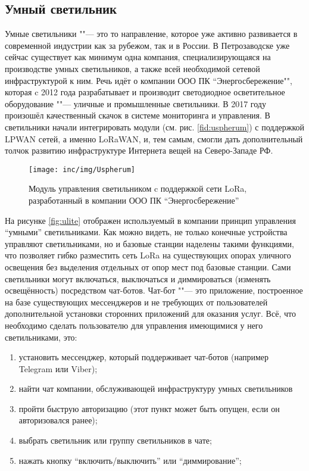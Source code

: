 \subsection{Умный светильник}

Умные светильники ""--- это то направление, которое уже активно развивается в современной индустрии как за рубежом, так и в России.
В Петрозаводске уже сейчас существует как минимум одна компания, специализирующаяся на производстве умных светильников, а также всей необходимой сетевой инфраструктурой к ним. 
Речь идёт о компании ООО ПК ``Энергосбережение"", которая c 2012 года разрабатывает и производит светодиодное осветительное оборудование ""--- уличные и промышленные светильники.
В 2017 году произошёл качественный скачок в системе мониторинга и управления.
В светильники начали интегрировать модули (см. рис. \ref{fid:uspherum}) с поддержкой LPWAN сетей, а именно LoRaWAN, и, тем самым, смогли дать дополнительный толчок развитию инфраструктуре Интернета вещей на Северо-Западе РФ.

\begin{figure}[!h]
  \centering
  \texttt{[image: inc/img/Uspherum]}
  \caption{Модуль управления светильником c поддержкой сети LoRa, разработанный в компании ООО ПК ``Энергосбережение''\cite{isbergsite}}
  \label{fig:uspherum}
\end{figure}

На рисунке \ref{fig:ulite} отображен используемый в компании принцип управления ``умными'' светильниками. 
Как можно видеть, не только конечные устройства управляют светильниками, но и базовые станции наделены такими функциями, что позволяет гибко разместить сеть LoRa на существующих опорах уличного освещения без выделения отдельных от опор мест под базовые станции.
Сами светильники могут включаться, выключаться и диммироваться (изменять освещённость) посредством чат-ботов. 
Чат-бот ""--- это приложение, построенное на базе существующих мессенджеров и не требующих от пользователей дополнительной установки сторонних приложений для оказания услуг.
Всё, что необходимо сделать пользователю для управления имеющимися у него светильниками, это:
\begin{enumerate}
 \item установить мессенджер, который поддерживает чат-ботов (например Telegram или Viber);
 \item найти чат компании, обслуживающей инфраструктуру умных светильников
 \item пройти быструю авторизацию (этот пункт может быть опущен, если он авторизовался ранее);
 \item выбрать светильник или группу светильников в чате;
 \item нажать кнопку ``включить/выключить'' или ``диммирование'';
\end{enumerate}

